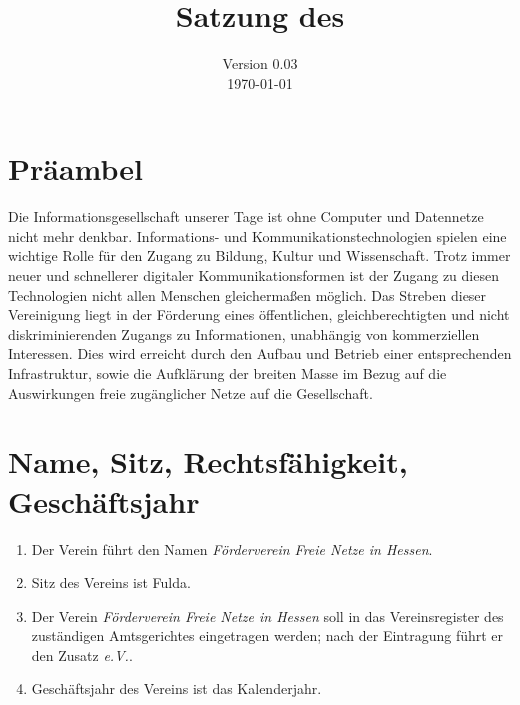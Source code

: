 \documentclass[ngerman]{article}
\title{Satzung des\\
\emph{\NameVerein}}
\date{Version 0.03\\
\today}
\newcommand{\NameVerein}{Förderverein Freie Netze in Hessen}
\begin{document}
\maketitle

\thispagestyle{empty}
\pagebreak

\section{Präambel}
Die Informationsgesellschaft unserer Tage ist ohne Computer und Datennetze nicht mehr denkbar. In\-for\-ma\-tions- und Kommunikationstechnologien spielen eine wichtige Rolle für den Zugang zu Bildung, Kultur und Wissenschaft. Trotz immer neuer und schnellerer digitaler Kommunikationsformen ist der Zugang zu diesen Technologien nicht allen Menschen gleichermaßen möglich. Das Streben dieser Vereinigung liegt in der Förderung eines öffentlichen, gleichberechtigten und nicht diskriminierenden Zugangs zu Informationen, unabhängig von kommerziellen Interessen. Dies wird erreicht durch den Aufbau und Betrieb einer entsprechenden Infrastruktur, sowie die Aufklärung der breiten Masse im Bezug auf die Auswirkungen freie zugänglicher Netze auf die Gesellschaft.


\section{Name, Sitz, Rechtsfähigkeit, Geschäftsjahr}
\begin{enumerate}
  \item Der Verein führt den Namen \emph{\NameVerein}.
  \item Sitz des Vereins ist Fulda.
  \item Der Verein \emph{\NameVerein} soll in das Vereinsregister des zuständigen Amtsgerichtes eingetragen werden; nach der Eintragung führt er den Zusatz \emph{e.V.}.
  \item Geschäftsjahr des Vereins ist das Kalenderjahr.
\end{enumerate}
\end{document}
